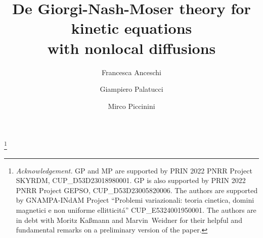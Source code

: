 \documentclass[leqno,10pt]{amsart}
\theoremstyle{plain}
\theoremstyle{remark}
\numberwithin{equation}{section}
\begin{document}
\title[Kinetic integral equations]{De Giorgi-Nash-Moser theory for  kinetic equations \\ with nonlocal diffusions}



\author[F. Anceschi]{Francesca Anceschi}  
\address[Francesca Anceschi]{Dipartimento di scienza e alta tecnologia, Universit\`a degli Studi dell'Insubria, Via Valleggio 11, 22100 Como, Italy} 

\author[G. Palatucci]{Giampiero Palatucci}  
\address[Giampiero Palatucci]{Dipartimento di Scienze Matematiche, Fisiche e Informatiche, Universit\`a di Parma, Campus - Parco Area delle Scienze 53/A, 43124 Parma, Italy}  

\author[M. Piccinini]{Mirco Piccinini} 
\address[Mirco Piccinini]{Dipartimento di Matematica, Universit\`a di Pisa, L.go~B.~Pontecorvo~5, 56127 Pisa, Italy}



\makeatletter
{}
\makeatother


\thanks{{\it Acknowledgement.} GP and MP are supported by PRIN 2022 PNRR Project SKYRDM, CUP\_D53D23018980001. GP is also supported by PRIN 2022 PNRR Project GEPSO, CUP\_D53D23005820006. The authors are supported by GNAMPA-INdAM Project ``Problemi variazionali: teoria cinetica, domini magnetici e non uniforme ellitticit\'a'' CUP\_E5324001950001. The authors are in debt with Moritz Ka{\ss}mann and Marvin~Weidner for their helpful and fundamental remarks on a preliminary version of the paper.}

\vspace{-3mm}
\end{document}
